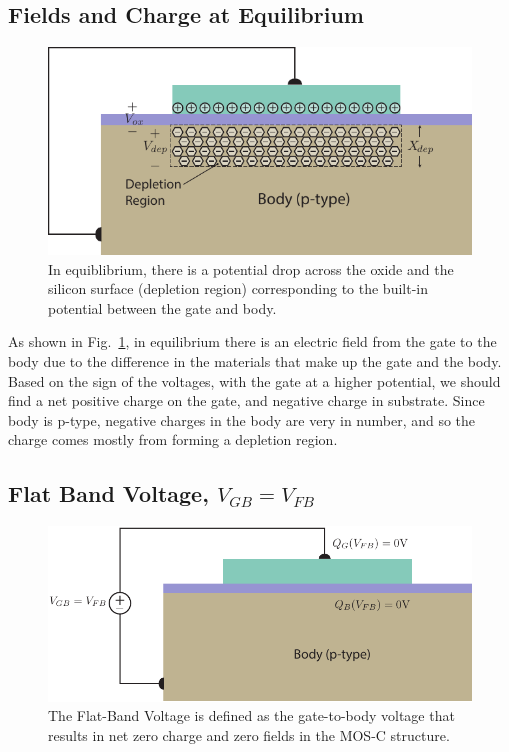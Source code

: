 \subsection{Fields and Charge at Equilibrium}
\begin{figure}[tbh]
\begin{center}
\includegraphics[width=.75\columnwidth]{mos_cap_equilibrium}
\end{center}
\caption{In equiblibrium, there is a potential drop across the oxide and the silicon surface (depletion region) corresponding to the built-in potential between the gate and body. } \label{fig:mos_charge_equil}
\end{figure}

As shown in Fig.~\ref{fig:mos_charge_equil}, in equilibrium there is an electric field from the gate to the body due to the difference in the materials that make up the gate and the body.  Based on the sign of the voltages, with the gate at a higher potential, we should find a net positive charge on the gate, and negative charge in substrate.   Since body is p-type, negative charges in the body are very in number, and so the charge comes mostly from forming a depletion region.
\subsection{Flat Band Voltage, $V_{GB} = V_{FB}$}
\begin{figure}[tbh]
\begin{center}
\includegraphics[width=.75\columnwidth]{mos_cap_flatband}
\end{center}
\caption{The Flat-Band Voltage is defined as the gate-to-body voltage that results in net zero charge and zero fields in the MOS-C structure.}
\label{fig:mos_flatband}
\end{figure}

